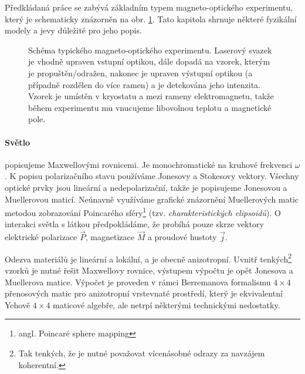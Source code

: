 Předkládaná práce se zabývá základním typem magneto-optického experimentu, který je schematicky znázorněn na obr. \ref{fig:uvodni-diagram}.
Tato kapitola shrnuje některé fyzikální modely a jevy důležité pro jeho popis.

\begin{figure}[htbp]
    \centering
    
    \caption{Schéma typického magneto-optického experimentu. 
    Laserový svazek je vhodně upraven vstupní optikou, dále dopadá na vzorek, kterým je propuštěn/odražen, nakonec je upraven výstupní optikou (a případně rozdělen do více ramen) a je detekována jeho intenzita. 
    Vzorek je umístěn v kryostatu a mezi rameny elektromagnetu, takže během experimentu mu vnucujeme libovolnou teplotu a magnetické pole.}
    \label{fig:uvodni-diagram}
\end{figure}


\paragraph{Světlo}
popisujeme Maxwellovými rovnicemi.
Je monochromatické na kruhové frekvenci $\omega$.
K popisu polarizačního stavu používáme Jonesovy a Stokesovy vektory.
Všechny optické prvky jsou lineární a nedepolarizační, takže je popisujeme Jonesovou a Muellerovou maticí\cite{gilReviewMuellerMatrix2014}.
Neúnavně využíváme grafické znázornění Muellerových matic metodou zobrazování Poincarého sféry\footnote{angl. Poincaré sphere mapping} (tzv. \emph{charakteristických elipsoidů})\cite{gilReviewMuellerMatrix2014,ossikovskiPoincareSphereMapping2013}.
O interakci světla s látkou předpokládáme, že probíhá pouze skrze vektory elektrické polarizace $\vec{P}$, magnetizace $\vec{M}$ a proudové hustoty $\vec{j}$. 

Odezva materiálů je lineární a lokální, a je obecně anizotropní. 
Uvnitř tenkých\footnote{Tak tenkých, že je nutné považovat vícenásobné odrazy za navzájem koherentní.} vzorků je nutné řešit Maxwellovy rovnice, výstupem výpočtu je opět Jonesova a Muellerova matice.
Výpočet je proveden v rámci Berremanova formalismu\cite{berremanOpticsStratifiedAnisotropic1972} $4\times 4$ přenosových matic pro anizotropní vrstevnaté prostředí, který je ekvivalentní Yehově $4\times 4$ maticové algebře\cite{yehElectromagneticPropagationBirefringent1979}, ale netrpí některými technickými nedostatky\cite{xuOpticalDegeneraciesAnisotropic2000,wuSingularitiesMatrixFormalisms2018,garibelloSingularityYehTransfer2020,bertrandGeneralAnalyticalTreatment2001}.
        
